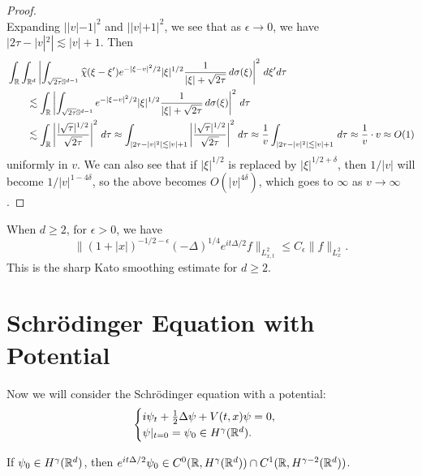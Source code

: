\begin{proof}
\[  \]
  Expanding $||v| - 1|^2$ and $||v| + 1|^2$, we see
  that as $\epsilon \to 0$,
  we have $|2\tau - |v|^2| \lesssim |v| + 1$. Then
  \begin{align*}
    &\int_{\mathbb{R}} \int_{\mathbb{R}^d} \left| \int_{\sqrt{2\tau} \mathbb{S}^{d - 1}} \widehat{\chi}(\xi - \xi') e^{-|\xi - v|^2 / 2} |\xi|^{1 / 2} \frac{1}{|\xi| + \sqrt{2\tau}} \, d\sigma(\xi)\right|^2\, d\xi' d\tau \\
    & \quad \quad \lesssim \int_{\mathbb{R}} \left|\int_{\sqrt{2\tau} \mathbb{S}^{d - 1}} e^{-|\xi - v|^2 / 2} |\xi|^{1 / 2} \frac{1}{|\xi| + \sqrt{2\tau}}\, d\sigma(\xi)\right|^2\, d\tau \\
    & \quad \quad \lesssim \int_{\mathbb{R}} \left|\frac{|\sqrt{\tau}|^{1 / 2}}{\sqrt{2\tau}}\right|^2\, d\tau
    \approx \int_{|2\tau - |v|^2| \lesssim |v| + 1}
    \left|\frac{|\sqrt{\tau}|^{1 / 2}}{\sqrt{2\tau}}\right|^2\, d\tau
    \approx \frac{1}{v} \int_{|2\tau - |v|^2| \lesssim |v| + 1}\, d\tau
    \approx \frac{1}{v} \cdot v \approx O(1)
  \end{align*}
  uniformly in $v$. We can also see that if
  $|\xi|^{1 / 2}$ is replaced by $|\xi|^{1 / 2 + \delta}$,
  then $1 / |v|$ will become $1 / |v|^{1 - 4 \delta}$,
  so the above becomes $O(|v|^{4\delta})$, which
  goes to $\infty$ as $v \to \infty$.
\end{proof}

\begin{corollary}
  When $d \ge 2$, for $\epsilon > 0$, we have
  \[
    \|(1 + |x|)^{-1 / 2 -\epsilon} (-\Delta)^{1 / 4} e^{it\Delta / 2} f\|_{L^2_{x, t}} \le C_\epsilon \|f\|_{L^2_x}.
  \]
  This is the sharp Kato smoothing estimate for
  $d \ge 2$.
\end{corollary}

\section{Schr\"odinger Equation with Potential}
\begin{remark}
  Now we will consider the Schr\"odinger equation with
  a potential:
  \[
  \begin{cases}
    i\psi_t + \frac{1}{2} \Delta \psi + V(t, x) \psi = 0, \\
    \psi|_{t = 0} = \psi_0 \in H^\gamma(\mathbb{R}^d).
  \end{cases}
  \]
\end{remark}

\begin{lemma}
  If $\psi_0 \in H^\gamma(\mathbb{R}^d)$, then
  $e^{it\Delta / 2} \psi_0 \in C^0(\mathbb{R}, H^\gamma(\mathbb{R}^d)) \cap C^1(\mathbb{R}, H^{\gamma - 2}(\mathbb{R}^d))$.
\end{lemma}

